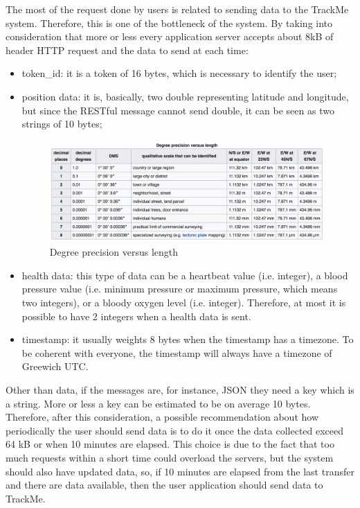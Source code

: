 The most of the request done by users is related to sending data to the TrackMe system. Therefore, this is one of the bottleneck 
of the system. By taking into consideration that more or less every application server accepts about 8kB of header HTTP request and the data to send at each time:
\begin{itemize}
\item token\_id: it is a token of 16 bytes, which is necessary to identify the user;
\item position data: it is, basically, two double representing latitude and longitude, but since the RESTful message cannot send double, it can be seen as two strings of 10 bytes;
\begin{figure}[H]
\includegraphics[width=\linewidth]{Images/gpsprecision.pdf}
\caption{ Degree precision versus length }
\label{fig:precisiongps}
\end{figure}
\item health data: this type of data can be a heartbeat value (i.e. integer), a blood pressure value (i.e. minimum pressure or maximum pressure, which means two integers), or a bloody oxygen level (i.e. integer). Therefore, at most it is possible to have 2 integers when a health data is sent.
\item timestamp: it usually weights 8 bytes when the timestamp has a timezone. To be coherent with everyone, the timestamp will always have a timezone of Greewich UTC.
\end{itemize}
Other than data, if the messages are, for instance, JSON they need a key which is a string. More or less a key can be estimated to be on average 10 bytes. Therefore, after this consideration, a possible recommendation about how periodically the user should send data is to do it once the data collected exceed 64 kB or when 10 minutes are elapsed. This choice is due to the fact that too much requests within a short time could overload the servers, but the system should also have updated data, so, if 10 minutes are elapsed from the last transfer and there are data available, then the user application should send data to TrackMe.
